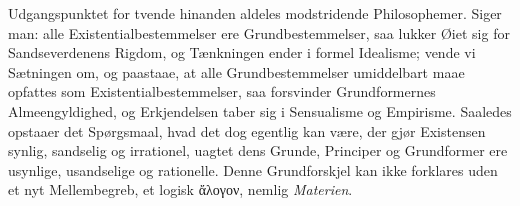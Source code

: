 \documentclass[12pt]{book}
\begin{document}
Udgangspunktet for tvende hinanden aldeles modstridende Philosophemer. Siger man: alle
Existentialbestemmelser ere Grundbestemmelser, saa lukker Øiet sig for Sandseverdenens Rigdom,
og Tænkningen ender i formel Idealisme; vende vi Sætningen om, og paastaae, at alle
Grundbestemmelser umiddelbart maae opfattes som Existentialbestemmelser, saa forsvinder
Grundformernes Almeengyldighed, og Erkjendelsen taber sig i Sensualisme og Empirisme. Saaledes
opstaaer det Spørgsmaal, hvad det dog egentlig kan være, der gjør Existensen synlig, sandselig
og irrationel, uagtet dens Grunde, Principer og Grundformer ere usynlige, usandselige og
rationelle. Denne Grundforskjel kan ikke forklares uden et nyt Mellembegreb, et logisk ἄλογον,
nemlig \emph{Materien}.
\end{document}

